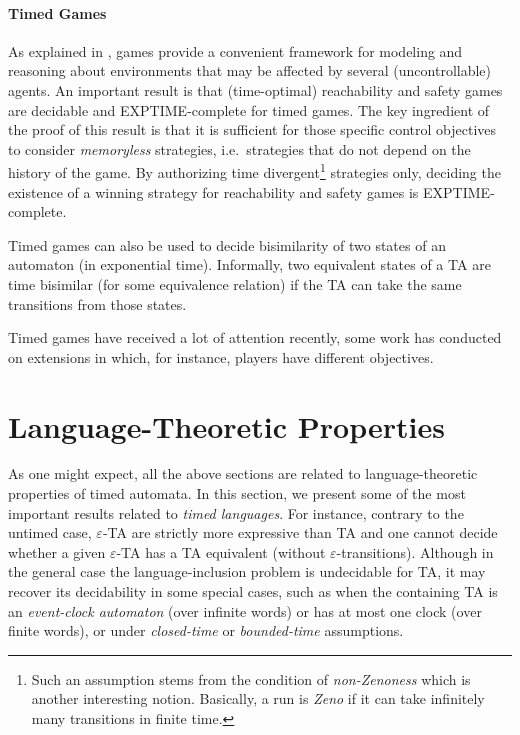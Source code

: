 \documentclass[11pt]{article}
\theoremstyle{definition}
\theoremstyle{remark}
\theoremstyle{definition}
\begin{document}
\paragraph{Timed Games}\label{par:timedgames}
As explained in \cite[Chapter 27]{handbook}, games provide a convenient framework for modeling and reasoning about environments that may be affected by several (uncontrollable) agents.
An important result is that (time-optimal) reachability and safety games are decidable and EXPTIME-complete for timed games.
The key ingredient of the proof of this result is that it is sufficient for those specific control objectives to consider \emph{memoryless} strategies, i.e.\ strategies that do not depend on the history of the game.
By authorizing time divergent\footnote{Such an assumption stems from the condition of \emph{non-Zenoness} which is another interesting notion. Basically, a run is \emph{Zeno} if it can take infinitely many transitions in finite time.} strategies only, deciding the existence of a winning strategy for reachability and safety games is EXPTIME-complete.

Timed games can also be used to decide bisimilarity of two states of an automaton (in exponential time).
Informally, two equivalent states of a TA are time bisimilar (for some equivalence relation) if the TA can take the same transitions from those states.

Timed games have received a lot of attention recently, some work has conducted on extensions in which, for instance, players have different objectives.

\section{Language-Theoretic Properties}\label{sec:lang}
As one might expect, all the above sections are related to language-theoretic properties of timed automata.
In this section, we present some of the most important results related to \emph{timed languages}.
For instance, contrary to the untimed case, $\varepsilon$-TA are strictly more expressive than TA and one cannot decide whether a given $\varepsilon$-TA has a TA equivalent (without $\varepsilon$-transitions).
Although in the general case the language-inclusion problem is undecidable for TA, it may recover its decidability in some special cases, such as when the containing TA is an \emph{event-clock automaton} (over infinite words) or has at most one clock (over finite words), or under \emph{closed-time} or \emph{bounded-time} assumptions.



\end{document}
